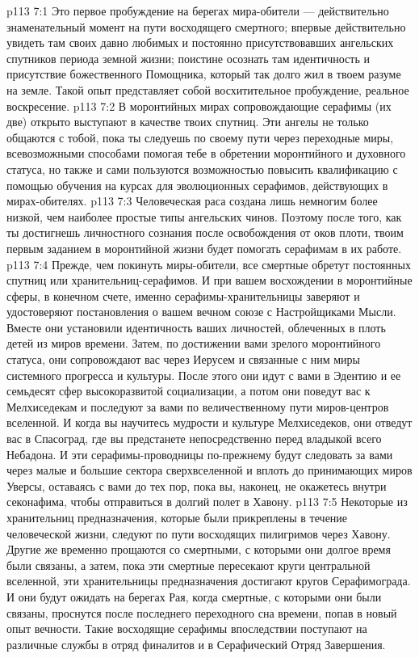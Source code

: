 \vs p113 7:1 Это первое пробуждение на берегах мира\hyp{}обители --- действительно знаменательный момент на пути восходящего смертного; впервые действительно увидеть там своих давно любимых и постоянно присутствовавших ангельских спутников периода земной жизни; поистине осознать там идентичность и присутствие божественного Помощника, который так долго жил в твоем разуме на земле. Такой опыт представляет собой восхитительное пробуждение, реальное воскресение.
\vs p113 7:2 В моронтийных мирах сопровождающие серафимы (их две) открыто выступают в качестве твоих спутниц. Эти ангелы не только общаются с тобой, пока ты следуешь по своему пути через переходные миры, всевозможными способами помогая тебе в обретении моронтийного и духовного статуса, но также и сами пользуются возможностью повысить квалификацию с помощью обучения на курсах для эволюционных серафимов, действующих в мирах\hyp{}обителях.
\vs p113 7:3 Человеческая раса создана лишь немногим более низкой, чем наиболее простые типы ангельских чинов. Поэтому после того, как ты достигнешь личностного сознания после освобождения от оков плоти, твоим первым заданием в моронтийной жизни будет помогать серафимам в их работе.
\vs p113 7:4 Прежде, чем покинуть миры\hyp{}обители, все смертные обретут постоянных спутниц или хранительниц\hyp{}серафимов. И при вашем восхождении в моронтийные сферы, в конечном счете, именно серафимы\hyp{}хранительницы заверяют и удостоверяют постановления о вашем вечном союзе с Настройщиками Мысли. Вместе они установили идентичность ваших личностей, облеченных в плоть детей из миров времени. Затем, по достижении вами зрелого моронтийного статуса, они сопровождают вас через Иерусем и связанные с ним миры системного прогресса и культуры. После этого они идут с вами в Эдентию и ее семьдесят сфер высокоразвитой социализации, а потом они поведут вас к Мелхиседекам и последуют за вами по величественному пути миров\hyp{}центров вселенной. И когда вы научитесь мудрости и культуре Мелхиседеков, они отведут вас в Спасоград, где вы предстанете непосредственно перед владыкой всего Небадона. И эти серафимы\hyp{}проводницы по\hyp{}прежнему будут следовать за вами через малые и большие сектора сверхвселенной и вплоть до принимающих миров Уверсы, оставаясь с вами до тех пор, пока вы, наконец, не окажетесь внутри секонафима, чтобы отправиться в долгий полет в Хавону.
\vs p113 7:5 Некоторые из хранительниц предназначения, которые были прикреплены в течение человеческой жизни, следуют по пути восходящих пилигримов через Хавону. Другие же временно прощаются со смертными, с которыми они долгое время были связаны, а затем, пока эти смертные пересекают круги центральной вселенной, эти хранительницы предназначения достигают кругов Серафимограда. И они будут ожидать на берегах Рая, когда смертные, с которыми они были связаны, проснутся после последнего переходного сна времени, попав в новый опыт вечности. Такие восходящие серафимы впоследствии поступают на различные службы в отряд финалитов и в Серафический Отряд Завершения.
